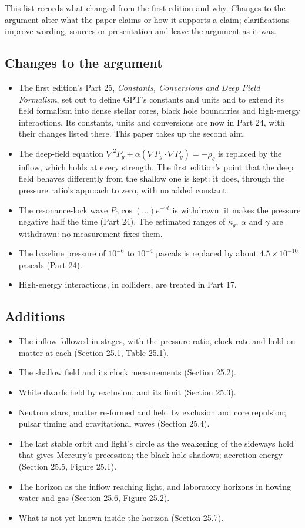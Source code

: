 \documentclass[11pt,a4paper]{article}
\begin{document}
This list records what changed from the first edition and why. Changes to the argument alter what the paper claims or how it supports a claim; clarifications improve wording, sources or presentation and leave the argument as it was.

\subsection*{Changes to the argument}
\begin{itemize}
\item The first edition's Part 25, \textit{Constants, Conversions and Deep Field Formalism}, set out to define GPT's constants and units and to extend its field formalism into dense stellar cores, black hole boundaries and high-energy interactions. Its constants, units and conversions are now in Part 24, with their changes listed there. This paper takes up the second aim.
\item The deep-field equation $\nabla^2 P_g + \alpha(\nabla P_g\cdot\nabla P_g) = -\rho_g$ is replaced by the inflow, which holds at every strength. The first edition's point that the deep field behaves differently from the shallow one is kept: it does, through the pressure ratio's approach to zero, with no added constant.
\item The resonance-lock wave $P_0\cos(\ldots)e^{-\gamma t}$ is withdrawn: it makes the pressure negative half the time (Part 24). The estimated ranges of $\kappa_g$, $\alpha$ and $\gamma$ are withdrawn: no measurement fixes them.
\item The baseline pressure of $10^{-6}$ to $10^{-4}$ pascals is replaced by about $4.5\times10^{-10}$ pascals (Part 24).
\item High-energy interactions, in colliders, are treated in Part 17.
\end{itemize}

\subsection*{Additions}
\begin{itemize}
\item The inflow followed in stages, with the pressure ratio, clock rate and hold on matter at each (Section 25.1, Table 25.1).
\item The shallow field and its clock measurements (Section 25.2).
\item White dwarfs held by exclusion, and its limit (Section 25.3).
\item Neutron stars, matter re-formed and held by exclusion and core repulsion; pulsar timing and gravitational waves (Section 25.4).
\item The last stable orbit and light's circle as the weakening of the sideways hold that gives Mercury's precession; the black-hole shadows; accretion energy (Section 25.5, Figure 25.1).
\item The horizon as the inflow reaching light, and laboratory horizons in flowing water and gas (Section 25.6, Figure 25.2).
\item What is not yet known inside the horizon (Section 25.7).
\end{itemize}
\end{document}
